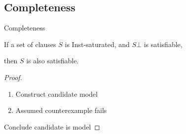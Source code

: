 \documentclass[%
handout,
]{beamer}
\begin{document}
\subsection{Completeness}
\begin{frame}{Completeness}

    \vspace{1.4em}

    \begin{theorem}
    If a set of clauses $S$ is Inst-saturated,
    and $S\bot$ is satisfiable,

    then $S$ is also satisfiable.
    \end{theorem}
    \vspace{1.4em}

    \begin{proof}
        \begin{enumerate}
            \item Construct candidate model
            \item Assumed counterexample fails
        \end{enumerate}
        Conclude candidate is model
        \end{proof}
\end{frame}
\end{document}
